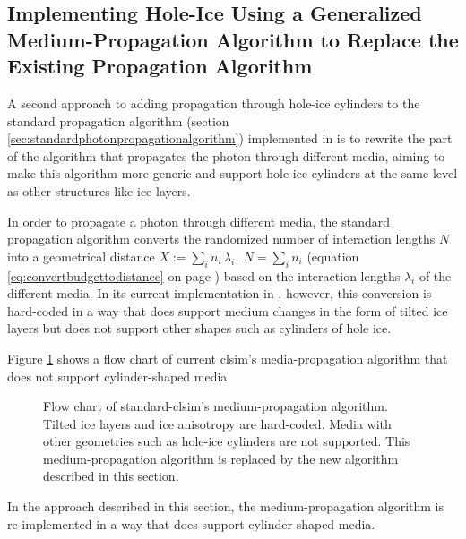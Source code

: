 
\subsection{Implementing Hole-Ice Using a Generalized Medium-Propagation Algorithm to Replace the Existing Propagation Algorithm}
\label{sec:algorithm_b}


A second approach to adding propagation through hole-ice cylinders to the standard propagation algorithm (section \ref{sec:standardphotonpropagationalgorithm}) implemented in  is to rewrite the part of the algorithm that propagates the photon through different media, aiming to make this algorithm more generic and support hole-ice cylinders at the same level as other structures like ice layers.


In order to propagate a photon through different media, the standard propagation algorithm converts the randomized number of interaction lengths $N$ into a geometrical distance $X:=\sum_i n_i\,\lambda_i,\ N = \sum_i n_i$ (equation \ref{eq:convertbudgettodistance} on page \pageref{eq:convertbudgettodistance}) based on the interaction lengths $\lambda_i$ of the different media. In its current implementation in , however, this conversion is hard-coded in a way that does support medium changes in the form of tilted ice layers but does not support other shapes such as cylinders of hole ice.

Figure \ref{fig:rieQu7sh} shows a flow chart of current clsim's media-propagation algorithm that does not support cylinder-shaped media.

\begin{figure}[htbp]
  \caption{Flow chart of standard-clsim's medium-propagation algorithm. Tilted ice layers and ice anisotropy are hard-coded. Media with other geometries such as hole-ice cylinders are not supported. This medium-propagation algorithm is replaced by the new algorithm described in this section.}
  \label{fig:rieQu7sh}
\end{figure}

In the approach described in this section, the medium-propagation algorithm is re-implemented in a way that does support cylinder-shaped media.

